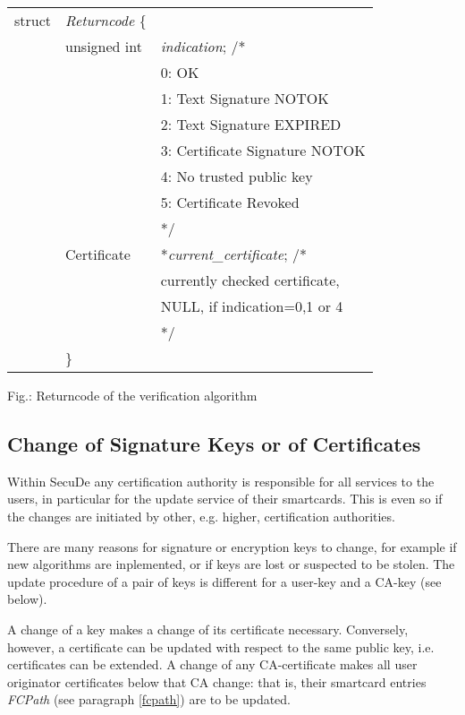 \begin {center}
\begin {tabular}{lll}
struct & {\em Returncode} \{ & \\
       & unsigned int  & {\em indication}; /* \\
       &               & 0: OK                \\
       &               & 1: Text Signature NOTOK         \\
       &               & 2: Text Signature EXPIRED       \\
       &               & 3: Certificate Signature NOTOK  \\
       &               & 4: No trusted public key        \\
       &               & 5: Certificate Revoked          \\
       &               & */                    \\
       & Certificate   & *{\em current\_certificate}; /* \\
       &               & currently checked certificate,  \\
       &               & NULL, if indication=0,1 or 4    \\
       &               & */                    \\
       & \}            & \\
\end {tabular}
\end {center}
 
\label{fig-ops-vds}
{\footnotesize Fig.: Returncode of the verification algorithm}
 
\subsection{Change of Signature Keys or of Certificates}
\label{ops-csk}

Within SecuDe
any certification authority is responsible for all services to the users,
in particular for the update service of their smartcards.
This is even so if the changes are initiated by other, e.g. higher,
certification authorities.

There are many reasons for signature or encryption keys to change,
for example if new algorithms are inplemented, or
if keys are lost or suspected to be stolen.
The update procedure of a pair of keys is different
for a user-key and a CA-key (see below).

A change of a key makes a change of its certificate necessary.
Conversely, however, a certificate can be updated with
respect to the same public key, i.e. certificates can be extended.
A change of any CA-certificate
makes all user originator certificates below that CA change:
that is, their smartcard entries {\em FCPath} (see paragraph \ref{fcpath})
are to be updated.

